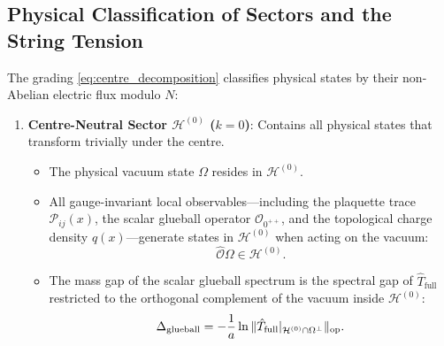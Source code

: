 \subsection{Physical Classification of Sectors and the String Tension}
\label{subsec:physical_classification_sectors}

The grading \eqref{eq:centre_decomposition} classifies physical states by their non-Abelian electric flux modulo $N$:
\begin{enumerate}
    \item \textbf{Centre-Neutral Sector $\mathcal{H}^{(0)}$ ($k = 0$)}:
    Contains all physical states that transform trivially under the centre. 
    \begin{itemize}
        \item The physical vacuum state $\Omega$ resides in $\mathcal{H}^{(0)}$.
        \item All gauge-invariant local observables—including the plaquette trace $\mathcal{P}_{ij}(x)$, the scalar glueball operator $\mathcal{O}_{0^{++}}$, and the topological charge density $q(x)$—generate states in $\mathcal{H}^{(0)}$ when acting on the vacuum:
        \begin{equation}
        \hat{\mathcal{O}} \Omega \in \mathcal{H}^{(0)}.
        \end{equation}
        \item The mass gap of the scalar glueball spectrum is the spectral gap of $\hat{T}_{\mathrm{full}}$ restricted to the orthogonal complement of the vacuum inside $\mathcal{H}^{(0)}$:
        \begin{equation}
        \Delta_{\mathrm{glueball}} = -\frac{1}{a} \ln \|\hat{T}_{\mathrm{full}}|_{\mathcal{H}^{(0)} \cap \Omega^\perp}\|_{\mathrm{op}}.
        \end{equation}
    \end{itemize}


\end{enumerate}
